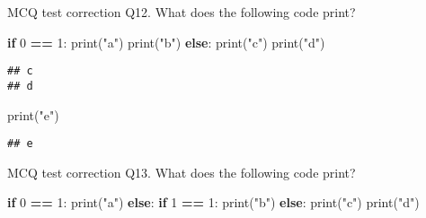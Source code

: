 \documentclass[
  8pt,
  ignorenonframetext,
]{beamer}
\newenvironment{Shaded}{\begin{snugshade}}{\end{snugshade}}
\newcommand{\BuiltInTok}[1]{#1}
\newcommand{\ControlFlowTok}[1]{\textcolor[rgb]{0.13,0.29,0.53}{\textbf{#1}}}
\newcommand{\DecValTok}[1]{\textcolor[rgb]{0.00,0.00,0.81}{#1}}
\newcommand{\NormalTok}[1]{#1}
\newcommand{\OperatorTok}[1]{\textcolor[rgb]{0.81,0.36,0.00}{\textbf{#1}}}
\newcommand{\StringTok}[1]{\textcolor[rgb]{0.31,0.60,0.02}{#1}}
\begin{document}
\begin{frame}[fragile]{MCQ test correction}
\protect\hypertarget{mcq-test-correction-23}{}
Q12. What does the following code print?

\begin{Shaded}
\begin{Highlighting}[]
\ControlFlowTok{if} \DecValTok{0} \OperatorTok{==} \DecValTok{1}\NormalTok{:}
    \BuiltInTok{print}\NormalTok{(}\StringTok{"a"}\NormalTok{)}
    \BuiltInTok{print}\NormalTok{(}\StringTok{"b"}\NormalTok{)}
\ControlFlowTok{else}\NormalTok{:}
    \BuiltInTok{print}\NormalTok{(}\StringTok{"c"}\NormalTok{)}
    \BuiltInTok{print}\NormalTok{(}\StringTok{"d"}\NormalTok{)}
\end{Highlighting}
\end{Shaded}

\begin{verbatim}
## c
## d
\end{verbatim}

\begin{Shaded}
\begin{Highlighting}[]
\BuiltInTok{print}\NormalTok{(}\StringTok{"e"}\NormalTok{)}
\end{Highlighting}
\end{Shaded}

\begin{verbatim}
## e
\end{verbatim}
\end{frame}

\begin{frame}[fragile]{MCQ test correction}
\protect\hypertarget{mcq-test-correction-24}{}
Q13. What does the following code print?

\begin{Shaded}
\begin{Highlighting}[]
\ControlFlowTok{if} \DecValTok{0} \OperatorTok{==} \DecValTok{1}\NormalTok{:}
    \BuiltInTok{print}\NormalTok{(}\StringTok{"a"}\NormalTok{)}
\ControlFlowTok{else}\NormalTok{:}
    \ControlFlowTok{if} \DecValTok{1} \OperatorTok{==} \DecValTok{1}\NormalTok{:}
        \BuiltInTok{print}\NormalTok{(}\StringTok{"b"}\NormalTok{)}
    \ControlFlowTok{else}\NormalTok{:}
        \BuiltInTok{print}\NormalTok{(}\StringTok{"c"}\NormalTok{)}
    \BuiltInTok{print}\NormalTok{(}\StringTok{"d"}\NormalTok{)}
\end{Highlighting}
\end{Shaded}
\end{frame}
\end{document}
